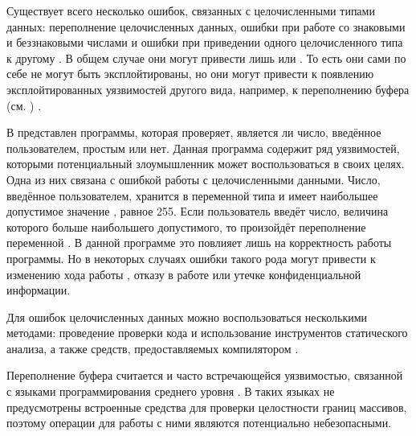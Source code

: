 %
Существует всего несколько  ошибок, связанных с целочисленными типами данных: переполнение целочисленных данных, ошибки при работе со знаковыми и беззнаковыми числами и ошибки при приведении одного целочисленного типа к другому     . 
%
В общем случае они могут привести лишь  или . 
%
То есть они сами по себе не могут быть эксплойтированы, но они могут привести к появлению эксплойтированных уязвимостей другого вида, например, к переполнению буфера (см. ) . 

%
В  представлен  программы, которая проверяет, является ли число, введённое пользователем, простым или нет. 
%
Данная программа содержит ряд уязвимостей, которыми потенциальный злоумышленник может воспользоваться в своих целях. 
%
Одна из них связана с ошибкой работы с целочисленными данными.
%
Число, введённое пользователем, хранится в переменной  типа  и имеет наибольшее допустимое значение , равное 255.
%
Если пользователь введёт число, величина которого больше наибольшего допустимого, то произойдёт переполнение переменной . 
%
В данной программе это повлияет лишь на корректность работы программы. 
%
Но в некоторых случаях ошибки такого рода могут привести к изменению хода работы , отказу в работе или утечке конфиденциальной информации.

%
Для  ошибок целочисленных данных можно воспользоваться несколькими методами: проведение проверки кода и использование инструментов статического анализа, а также средств, предоставляемых компилятором  .



%
Переполнение буфера считается  и часто встречающейся уязвимостью, связанной с языками программирования среднего уровня . 
%
В таких языках не предусмотрены встроенные средства для проверки целостности границ массивов, поэтому операции для работы с ними являются потенциально небезопасными. 

